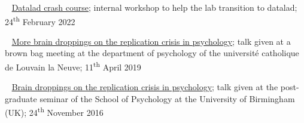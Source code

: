




\textbullet~ \href{https://cpp-lln-lab.github.io/datalad_crash_course/}
{Datalad crash course};
internal workshop to help the lab transition to datalad;
24\textsuperscript{th} February 2022

\textbullet~ \href{https://osf.io/vu327/}
{More brain droppings on the replication crisis in psychology};
talk given at a brown bag meeting at the department of psychology 
of the université catholique de Louvain la Neuve;
11\textsuperscript{th} April 2019

\textbullet~ \href{https://dx.doi.org/10.6084/m9.figshare.4257992.v1}
{Brain droppings on the replication crisis in psychology}; 
talk given at the post-graduate seminar of the School of Psychology 
at the University of Birmingham (UK);
24\textsuperscript{th} November 2016
